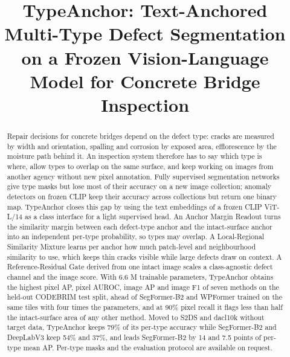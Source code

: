 \documentclass[conference]{IEEEtran}
\newcommand{\ours}{TypeAnchor}
\begin{document}
\title{\ours{}: Text-Anchored Multi-Type Defect Segmentation on a Frozen Vision-Language Model for Concrete Bridge Inspection}

\author{
}

\maketitle

\begin{abstract}
Repair decisions for concrete bridges depend on the defect type: cracks are measured by width and orientation, spalling and corrosion by exposed area, efflorescence by the moisture path behind it. An inspection system therefore has to say which type is where, allow types to overlap on the same surface, and keep working on images from another agency without new pixel annotation. Fully supervised segmentation networks give type masks but lose most of their accuracy on a new image collection; anomaly detectors on frozen CLIP keep their accuracy across collections but return one binary map. \ours{} closes this gap by using the text embeddings of a frozen CLIP ViT-L/14 as a class interface for a light supervised head. An Anchor Margin Readout turns the similarity margin between each defect-type anchor and the intact-surface anchor into an independent per-type probability, so types may overlap. A Local-Regional Similarity Mixture learns per anchor how much patch-level and neighbourhood similarity to use, which keeps thin cracks visible while large defects draw on context. A Reference-Residual Gate derived from one intact image scales a class-agnostic defect channel and the image score. With 6.6 M trainable parameters, \ours{} obtains the highest pixel AP, pixel AUROC, image AP and image F1 of seven methods on the held-out CODEBRIM test split, ahead of SegFormer-B2 and WPFormer trained on the same tiles with four times the parameters, and at 90\% pixel recall it flags less than half the intact-surface area of any other method. Moved to S2DS and dacl10k without target data, \ours{} keeps 79\% of its per-type accuracy while SegFormer-B2 and DeepLabV3 keep 54\% and 37\%, and leads SegFormer-B2 by 14 and 7.5 points of per-type mean AP. Per-type masks and the evaluation protocol are available on request.
\end{abstract}
\end{document}
